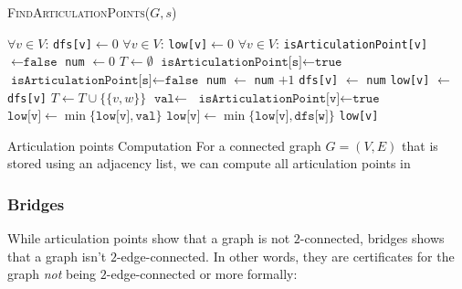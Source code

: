 \begin{algorithm}
    \caption{\textsc{FindArticulationPoints}($G, s$)}
    \begin{algorithmic}[1]
        \State $\forall v \in V$: \texttt{dfs[v]}$\gets 0$ 
        \State $\forall v \in V$: \texttt{low[v]}$\gets 0$ 
        \State $\forall v \in V$: \texttt{isArticulationPoint[v]}$\gets \texttt{false}$ 
        \State \texttt{num} $\gets 0$
        \State $T \gets \emptyset$ 
        \State {}
         
            \State $\texttt{isArticulationPoint[s]} \gets \texttt{true}$
        \Else
            \State $\texttt{isArticulationPoint[s]} \gets \texttt{false}$
        \EndIf
            \State \texttt{num} $\gets$ \texttt{num} $+ 1$
            \State \texttt{dfs[v]} $\gets$ \texttt{num}
            \State \texttt{low[v]} $\gets$ \texttt{dfs[v]}
                    \State $T \gets T \cup \{\{v, w\}\}$
                    \State $\texttt{val} \gets$ 
                     
                        \State $\texttt{isArticulationPoint[v]} \gets \texttt{true}$
                    \EndIf
                    \State $\texttt{low[v]} \gets \min \{\texttt{low[v]}, \texttt{val}\}$
                 
                    \State $\texttt{low[v]} \gets \min \{\texttt{low[v]}, \texttt{dfs[w]}\}$
                \EndIf
            \EndFor
            \State \Return \texttt{low[v]}
        \EndProcedure
    \end{algorithmic}
\end{algorithm}

\begin{theorem}[]{Articulation points Computation}
    For a connected graph $G = (V, E)$ that is stored using an adjacency list, we can compute all articulation points in 
\end{theorem}


\newpage
\subsubsection{Bridges}
While articulation points show that a graph is not $2$-connected, bridges shows that a graph isn't $2$-edge-connected.
In other words, they are certificates for the graph \textit{not} being $2$-edge-connected or more formally:

